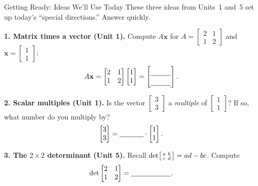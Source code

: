 \documentclass[10pt]{article}
\begin{document}
\namedateperiod

\vspace{0.12in}

\begin{notesbox}{Getting Ready: Ideas We'll Use Today}
\small These three ideas from Units~1 and~5 set up today's ``special directions.'' Answer quickly.

\vspace{4pt}
\textbf{1. Matrix times a vector (Unit 1).} Compute $A\mathbf{x}$ for
$A=\begin{bmatrix} 2 & 1 \\ 1 & 2 \end{bmatrix}$ and $\mathbf{x}=\begin{bmatrix} 1 \\ 1 \end{bmatrix}$:
\[
  A\mathbf{x}=\begin{bmatrix} 2 & 1 \\ 1 & 2 \end{bmatrix}\begin{bmatrix} 1 \\ 1 \end{bmatrix}
  = \begin{bmatrix}\rule{0pt}{1.1em}\blank{1.0cm}\\[2pt]\blank{1.0cm}\end{bmatrix}.
\]

\vspace{4pt}
\textbf{2. Scalar multiples (Unit 1).} Is the vector $\begin{bmatrix} 3 \\ 3 \end{bmatrix}$ a
\emph{multiple} of $\begin{bmatrix} 1 \\ 1 \end{bmatrix}$? If so, what number do you multiply by?
\[
  \begin{bmatrix} 3 \\ 3 \end{bmatrix} = \blank{1.2cm}\cdot\begin{bmatrix} 1 \\ 1 \end{bmatrix}.
\]

\vspace{4pt}
\textbf{3. The $2\times2$ determinant (Unit 5).} Recall $\det\begin{bsmallmatrix} a & b \\ c & d
\end{bsmallmatrix}=ad-bc$. Compute
\[
  \det\begin{bmatrix} 2 & 1 \\ 1 & 2 \end{bmatrix} = \blank{2.0cm}.
\]
\end{notesbox}
\end{document}
